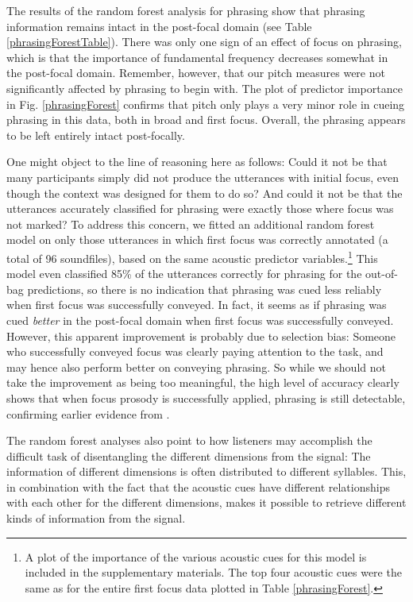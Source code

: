 \documentclass[preprint,review,12pt,authoryear,times]{elsarticle}
\begin{document}
The results of the random forest analysis for phrasing show that phrasing information remains intact in the post-focal domain (see Table \ref{phrasingForestTable}). There was only one sign of an effect of focus on phrasing, which is that the importance of fundamental frequency decreases somewhat in the post-focal domain. Remember, however, that our pitch measures were not significantly affected by phrasing to begin with. The plot of predictor importance in Fig. \ref{phrasingForest} confirms that pitch only plays a very minor role in cueing phrasing in this data, both in broad and first focus. Overall, the phrasing appears to be left entirely intact post-focally.

One might object to the line of reasoning here as follows: Could it not be that many participants simply did not produce the utterances with initial focus, even though the context was designed for them to do so? And could it not be that the utterances accurately classified for phrasing were exactly those where focus was not marked? To address this concern, we fitted an additional random forest model on only those utterances in which first focus was correctly annotated (a total of 96 soundfiles), based on the same acoustic predictor variables.\footnote{A plot of the importance of the various acoustic cues for this model is included in the supplementary materials. The top four acoustic cues were the same as for the entire first focus data plotted in Table \ref{phrasingForest}.}  This model even classified 85\% of the utterances correctly for phrasing for the out-of-bag predictions, so there is no indication that phrasing was cued less reliably when first focus was successfully conveyed. In fact, it seems as if phrasing was cued {\em better} in the post-focal domain when first focus was successfully conveyed. However, this apparent improvement is probably due to selection bias: Someone who successfully conveyed focus was clearly paying attention to the task, and may hence also perform better on conveying phrasing. So while we should not take the improvement as being too meaningful, the high level of accuracy clearly shows that when focus prosody is successfully applied, phrasing is still detectable, confirming earlier evidence from \citet{norcl05}.

The random forest analyses also point to how listeners may accomplish the difficult task of disentangling the different dimensions from the signal: The information of different dimensions is often distributed to different syllables. This, in combination with the fact that the acoustic cues have different relationships with each other for the different dimensions, makes it possible to retrieve different kinds of information from the signal. 
\end{document}
